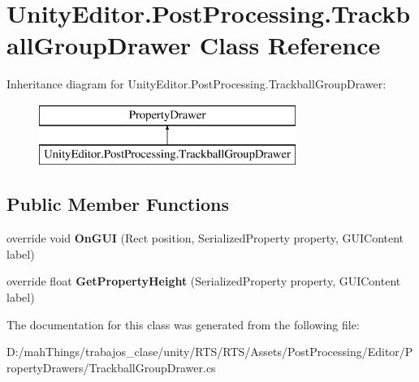 \hypertarget{class_unity_editor_1_1_post_processing_1_1_trackball_group_drawer}{}\section{Unity\+Editor.\+Post\+Processing.\+Trackball\+Group\+Drawer Class Reference}
\label{class_unity_editor_1_1_post_processing_1_1_trackball_group_drawer}
Inheritance diagram for Unity\+Editor.\+Post\+Processing.\+Trackball\+Group\+Drawer\+:\begin{figure}[H]
\begin{center}
\leavevmode
\includegraphics[height=2.000000cm]{class_unity_editor_1_1_post_processing_1_1_trackball_group_drawer}
\end{center}
\end{figure}
\subsection*{Public Member Functions}
\begin{DoxyCompactItemize}
\item 
\mbox{\label{class_unity_editor_1_1_post_processing_1_1_trackball_group_drawer_a8d90fa1568d3c85d649dfcc4814e7433}} 
override void {\bfseries On\+G\+UI} (Rect position, Serialized\+Property property, G\+U\+I\+Content label)
\item 
\mbox{\label{class_unity_editor_1_1_post_processing_1_1_trackball_group_drawer_ad37342e5aad4e98329b8d41666db6d9a}} 
override float {\bfseries Get\+Property\+Height} (Serialized\+Property property, G\+U\+I\+Content label)
\end{DoxyCompactItemize}


The documentation for this class was generated from the following file\+:\begin{DoxyCompactItemize}
\item 
D\+:/mah\+Things/trabajos\+\_\+clase/unity/\+R\+T\+S/\+R\+T\+S/\+Assets/\+Post\+Processing/\+Editor/\+Property\+Drawers/Trackball\+Group\+Drawer.\+cs\end{DoxyCompactItemize}
